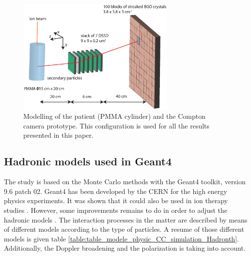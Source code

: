 \documentclass[12pt]{iopart}
\begin{document}
	\begin{figure} [!hbtp]	
	\centering
	\includegraphics[width=0.7\textwidth]{./Figure/Material_Methods/Compton_Camera_hadontherapy_PMMA_Cylinder_EN.eps}
		\caption{Modelling of the patient (PMMA cylinder) and the Compton camera prototype. This configuration is used for all the results presented in this paper.}
	\label{fig:fig_setup_CC_simulation_Hadronth}
	\end{figure}


\subsection{Hadronic models used in Geant4\newline}

The study is based on the Monte Carlo methods with the Geant4 toolkit, version 9.6 patch 02. Geant4 has been developed by the CERN for the high energy physics experiments. It was shown that it could also be used in ion therapy studies \cite{cirrone_hadrontherapy_2011,toshito_new_2010}. However, some improvements remains to do in order to adjust the hadronic models \cite{dedes_assessment_2014} .
The interaction processes in the matter are described by means of different models according to the type of particles. A resume of those different models is given table \ref{table:table_modele_physic_CC_simulation_Hadronth}. Additionally, the Doppler broadening and the polarization is taking into account. 

\end{document}
